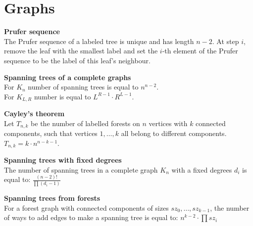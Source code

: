 \section{Graphs}

\textbf{Prufer sequence}\\
The Prufer sequence of a labeled tree is unique and has length $n - 2$. 
At step $i$, remove the leaf with the smallest label and set the $i$-th 
element of the Prufer sequence to be the label of this leaf's neighbour.

\textbf{Spanning trees of a complete graphs}\\
For $K_n$ number of spanning trees is equal to $n^{n - 2}$.\\
For $K_{L, R}$ number is equal to $L^{R - 1} \cdot R^{L - 1}$.

\textbf{Cayley's theorem}\\
Let $T_{n, k}$ be the number of labelled forests on $n$ vertices with $k$ connected components, 
such that vertices $1, \dots, k$ all belong to different components. 
$T_{n,k} = k \cdot n^{n - k - 1}$.

\textbf{Spanning trees with fixed degrees}\\
The number of spanning trees in a complete graph $K_{n}$ with a fixed degrees
$d_{i}$ is equal to:
$ \frac{(n - 2)!}{\prod(d_i - 1)} $

\textbf{Spanning trees from forests}\\
For a forest graph with connected components of sizes $sz_0, \dots, sz_{k - 1}$, 
the number of ways to add edges to make a spanning tree is equal to:
$ n^{k - 2} \cdot \prod sz_i$
